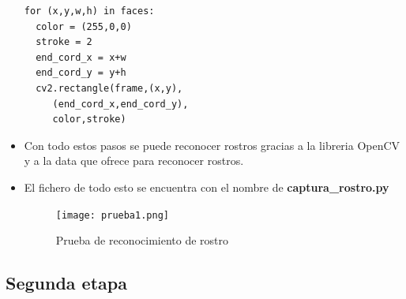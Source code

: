 \documentclass{vgtc}                          %
\begin{document}
\begin{itemize}
\begin{lstlisting}
for (x,y,w,h) in faces:
  color = (255,0,0)
  stroke = 2
  end_cord_x = x+w
  end_cord_y = y+h
  cv2.rectangle(frame,(x,y),
     (end_cord_x,end_cord_y),
     color,stroke)
\end{lstlisting}

\item Con todo estos pasos se puede reconocer rostros gracias a la libreria OpenCV y a la data que ofrece
para reconocer rostros.

\item El fichero de todo esto se encuentra con el nombre de \textbf{captura\_rostro.py}

\begin{figure}[h]
	\centering
	\texttt{[image: prueba1.png]}
	\caption{Prueba de reconocimiento de rostro}
\end{figure}

\end{itemize}

\subsection{Segunda etapa}
\end{document}

